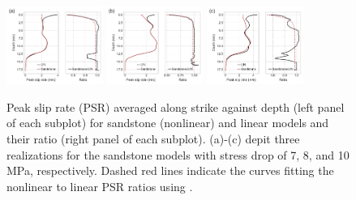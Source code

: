 \clearpage
\begin{figure}[!ht]
    \includegraphics[width=0.28\textwidth]{figures/figure_eks_2a.pdf}\label{fig:eks-2a} \hspace{0.02\textwidth}%
    \includegraphics[width=0.28\textwidth]{figures/figure_eks_2b.pdf}\label{fig:eks-2b} \hspace{0.02\textwidth}%
    \includegraphics[width=0.28\textwidth]{figures/figure_eks_2c.pdf}\label{fig:eks-2c} %
    \caption{Peak slip rate (PSR) averaged along strike against depth (left panel of each subplot) for sandstone (nonlinear) and linear models and their ratio (right panel of each subplot). (a)-(c) depit three realizations for the sandstone models with stress drop of 7, 8, and 10 MPa, respectively. Dashed red lines indicate the curves fitting the nonlinear to linear PSR ratios using .}
    \label{fig:eks-2}
\end{figure}
\clearpage


